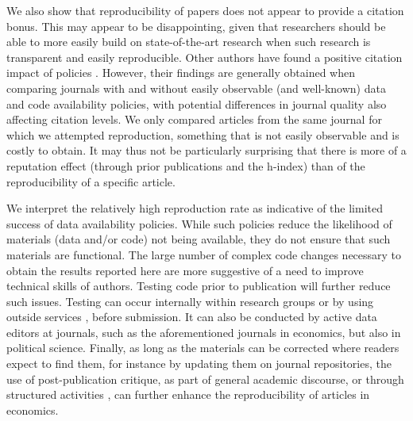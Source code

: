 \documentclass{cje} %
\theoremstyle{plain}%
\theoremstyle{definition}
\theoremstyle{remark}
\begin{document}
We also show that reproducibility of papers does not appear to provide a citation bonus. This may appear to be disappointing, given that researchers should be able to more easily build on state-of-the-art research when such research is  transparent and easily reproducible. 
Other authors have found a positive citation impact of policies \citep{gleditsch2003,Hoeffler2017}. However, their findings are generally obtained when comparing journals with and without easily observable (and well-known) data and code availability policies, with potential differences in journal quality also affecting citation levels. We only compared articles from the same journal for which we attempted reproduction, something that is not easily observable and is costly to obtain. It may thus not be particularly surprising that there is more of a reputation effect (through prior publications and the h-index) than of the reproducibility of a specific article.

We interpret the relatively high reproduction rate as indicative of the limited success of data availability policies. While such policies reduce the likelihood of materials (data and/or code) not being available, they do not ensure that such materials are functional. The large number of complex code changes necessary to obtain the results reported here are more suggestive of a need to improve technical skills of authors. Testing code prior to publication will further reduce such issues. Testing can occur internally within research groups or by using outside services \citep{perignon2019a}, before submission. It can also be conducted by active data editors at journals, such as the aforementioned journals in economics, but also in political science. Finally, as long as the materials can be corrected where readers expect to find them, for instance by updating them on journal repositories, the use of post-publication critique, as part of general academic discourse, or through structured activities \citep{brodeur2023}, can further enhance the reproducibility of articles in economics.



%

\newpage
\oneappendix
\end{document}
